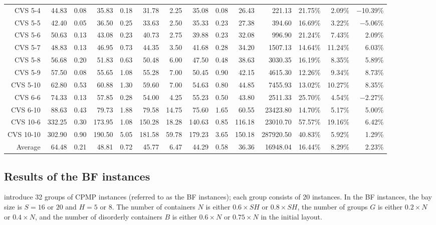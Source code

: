\documentclass[review,3p,times,12pt,number]{elsarticle}\usepackage{amsmath}\usepackage{amssymb}
\renewcommand{\citet}[1]{\citeauthor{#1} \citep{#1}}
\begin{document}
\begin{landscape}
\begin{table}[htbp]
\begin{tabular}{rrrrrrrrrrrrrr}
CVS 5-4   & 44.83  & 0.08 & 35.83  & 0.18 & 31.78  & 2.25 & 35.08  & 0.08  & 26.43 & 221.13  &  21.75\%  & 2.09\%   & $-$10.39\%\\
CVS 5-5   & 42.40  & 0.05 & 36.50  & 0.25 & 33.63  & 2.50 & 35.33  & 0.23  & 27.38 & 394.60  &  16.69\%  & 3.22\%   & $-$5.06\%\\
CVS 5-6   & 50.63  & 0.13 & 43.08  & 0.23 & 40.73  & 2.75 & 39.88  & 0.23  & 32.08 & 996.90  & 21.24\%  & 7.43\%   & 2.09\% \\
CVS 5-7   & 48.83  & 0.13 & 46.95  & 0.73 & 44.35  & 3.50 & 41.68  & 0.28  & 34.20 & 1507.13 &  14.64\%  & 11.24\%  & 6.03\%\\
CVS 5-8   & 56.68  & 0.20 & 51.83  & 0.63 & 50.48  & 6.00 & 47.50  & 0.48  & 38.63 & 3030.35 &  16.19\%  & 8.35\%   & 5.89\%\\
CVS 5-9   & 57.50  & 0.08 & 55.65  & 1.08 & 55.28  & 7.00 & 50.45  & 0.90  & 42.15 & 4615.30 &  12.26\%  & 9.34\%   & 8.73\%\\
CVS 5-10  & 62.80  & 0.53 & 60.88  & 1.30 & 59.60  & 7.00 & 54.63  & 0.80  & 44.85 & 7455.93 & 13.02\%  & 10.27\%  & 8.35\%\\
CVS 6-6   & 74.33  & 0.13 & 57.85  & 0.28 & 54.00  & 4.25 & 55.23  & 0.50  & 43.80 & 2511.33 &  25.70\%   & 4.54\%   & $-$2.27\%\\
CVS 6-10  & 88.63  & 0.43 & 79.73  & 1.88 & 79.58  & 14.75& 75.60  & 1.65  & 60.55 & 23423.80 & 14.70\%   & 5.17\%   & 5.00\%\\
CVS 10-6  & 332.25 & 0.30 & 173.95 & 1.08 & 150.28 & 18.28& 140.63 & 0.85 & 116.18 & 23010.70 &  57.57\%  & 19.16\%  & 6.42\%\\
CVS 10-10 & 302.90 & 0.90 & 190.50 & 5.05 & 181.58 & 59.78&179.23  & 3.65  & 150.18 & 287920.50 &  40.83\%  & 5.92\%   & 1.29\%\\[\defaultaddspace]
Average   & 64.48  & 0.21 & 48.81  & 0.72 & 45.77  & 6.47 &44.29  & 0.58  & 36.36 & 16948.04 &  16.44\%  & 8.29\%   & 2.23\%\\
\bottomrule
\end{tabular}
\end{table}
\end{landscape}

\subsection{Results of the BF instances}

\citet{bort2012} introduce 32 groups of CPMP instances (referred to as the BF instances); each group consists of 20 instances. In the BF instances, the bay size is $S=16$ or $20$ and $H=5$ or $8$. The number of containers $N$ is either $0.6\times SH$ or $0.8\times SH$, the number of groups $G$ is either $0.2\times N$ or $0.4\times N$, and the number of disorderly containers $B$ is either $0.6\times N$ or $0.75\times N$ in the initial layout.
\end{document}
